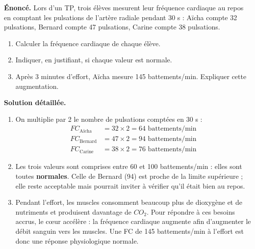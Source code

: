 \documentclass[11pt]{article}
\begin{document}
\begin{exoresolu}
\textbf{Énoncé.} Lors d'un TP, trois élèves mesurent leur fréquence cardiaque au repos en comptant les pulsations de l'artère radiale pendant 30 s : Aïcha compte 32 pulsations, Bernard compte 47 pulsations, Carine compte 38 pulsations.
\begin{enumerate}
\item Calculer la fréquence cardiaque de chaque élève.
\item Indiquer, en justifiant, si chaque valeur est normale.
\item Après 3 minutes d'effort, Aïcha mesure 145 battements/min. Expliquer cette augmentation.
\end{enumerate}
\tcblower
\textbf{Solution détaillée.}
\begin{enumerate}
\item On multiplie par 2 le nombre de pulsations comptées en 30 s :
\begin{align*}
FC_{\text{Aïcha}} &= 32 \times 2 = 64 \text{ battements/min}\\
FC_{\text{Bernard}} &= 47 \times 2 = 94 \text{ battements/min}\\
FC_{\text{Carine}} &= 38 \times 2 = 76 \text{ battements/min}
\end{align*}
\item Les trois valeurs sont comprises entre 60 et 100 battements/min : elles sont toutes \textbf{normales}. Celle de Bernard (94) est proche de la limite supérieure ; elle reste acceptable mais pourrait inviter à vérifier qu'il était bien au repos.
\item Pendant l'effort, les muscles consomment beaucoup plus de dioxygène et de nutriments et produisent davantage de $CO_2$. Pour répondre à ces besoins accrus, le cœur accélère : la fréquence cardiaque augmente afin d'augmenter le débit sanguin vers les muscles. Une FC de 145 battements/min à l'effort est donc une réponse physiologique normale.
\end{enumerate}
\end{exoresolu}
\end{document}
